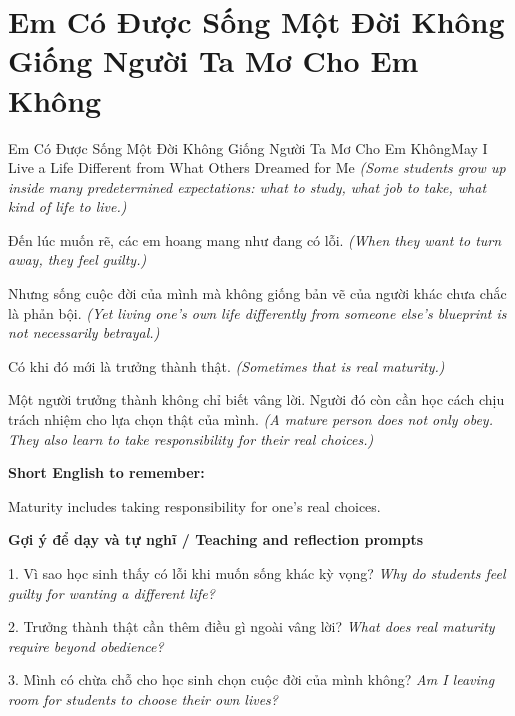 \section{Em Có Được Sống Một Đời Không Giống Người Ta Mơ Cho Em Không}
\begin{truyen}{Em Có Được Sống Một Đời Không Giống Người Ta Mơ Cho Em Không}{May I Live a Life Different from What Others Dreamed for Me}
\textit{(Some students grow up inside many predetermined expectations: what to study, what job to take, what kind of life to live.)}

Đến lúc muốn rẽ, các em hoang mang như đang có lỗi.
\textit{(When they want to turn away, they feel guilty.)}

Nhưng sống cuộc đời của mình mà không giống bản vẽ của người khác chưa chắc là phản bội.
\textit{(Yet living one's own life differently from someone else's blueprint is not necessarily betrayal.)}

Có khi đó mới là trưởng thành thật.
\textit{(Sometimes that is real maturity.)}

\end{truyen}

\begin{baihoc}
Một người trưởng thành không chỉ biết vâng lời. Người đó còn cần học cách chịu trách nhiệm cho lựa chọn thật của mình.
\textit{(A mature person does not only obey. They also learn to take responsibility for their real choices.)}
\end{baihoc}

\begin{ghinhoanh}
\textbf{Short English to remember:}

Maturity includes taking responsibility for one's real choices.

\end{ghinhoanh}

\begin{tuhocnhanh}
\textbf{Gợi ý để dạy và tự nghĩ / Teaching and reflection prompts}

1. Vì sao học sinh thấy có lỗi khi muốn sống khác kỳ vọng? \textit{Why do students feel guilty for wanting a different life?}

2. Trưởng thành thật cần thêm điều gì ngoài vâng lời? \textit{What does real maturity require beyond obedience?}

3. Mình có chừa chỗ cho học sinh chọn cuộc đời của mình không? \textit{Am I leaving room for students to choose their own lives?}
\end{tuhocnhanh}
\ngancach

